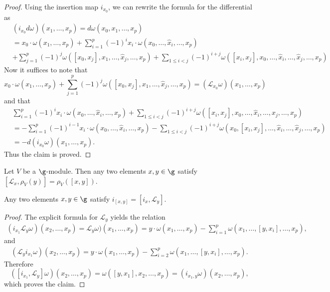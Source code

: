 \begin{proof}
Using the insertion map $i_{x_0}$, we can rewrite the formula for the differential as
\begin{equation*}\scriptstyle
\begin{aligned}
&(i_{x_0}d\omega)(x_1,\dots,x_p)=d\omega(x_0,x_1,\dots,x_p)\\
&=x_0\cdot\omega(x_1,\dots,x_p)+\sum_{i=1}^{p}(-1)^{i}x_i\cdot\omega(x_0,\dots,\widehat{x}_i,\dots,x_{p})\\
&+\sum_{j=1}^{p}(-1)^j\omega([x_0,x_j],x_1,\dots,\widehat{x}_j,\dots,x_p)+\sum_{1\leq i<j}(-1)^{i+j}\omega([x_i,x_j],x_0,\dots,\widehat{x}_i,\dots,\widehat{x}_j,\dots,x_{p})
\end{aligned}
\end{equation*}
Now it suffices to note that
\[x_0\cdot\omega(x_1,\dots,x_p)+\sum_{j=1}^{p}(-1)^j\omega([x_0,x_j],x_1,\dots,\widehat{x}_j,\dots,x_p)=(\mathcal{L}_{x_0}\omega)(x_1,\dots,x_p)\]
and that
\begin{equation*}\scriptstyle
\begin{aligned}
&\sum_{i=1}^{p}(-1)^{i}x_i\cdot\omega(x_0,\dots,\widehat{x}_i,\dots,x_{p})+\sum_{1\leq i<j}(-1)^{i+j}\omega([x_i,x_j],x_0,\dots,\widehat{x}_i,\dots,\widehat{x}_j,\dots,x_{p})\\
&=-\sum_{i=1}^{p}(-1)^{i-1}x_i\cdot\omega(x_0,\dots,\widehat{x}_i,\dots,x_p)-\sum_{1\leq i<j}(-1)^{i+j}\omega(x_0,[x_i,x_j],\dots,\widehat{x}_i,\dots,\widehat{x}_j,\dots,x_p)\\
&=-d(i_{x_0}\omega)(x_1,\dots,x_p).
\end{aligned}
\end{equation*}
Thus the claim is proved.
\end{proof}
\begin{proposition}\label{Lie algebra Lie derivative and action}
Let $V$ be a $\g$-module. Then any two elements $x,y\in\g$ satisfy $[\mathcal{L}_x,\rho_V(y)]=\rho_V([x,y])$.
\end{proposition}
\begin{proposition}\label{Lie algebra contraction braket}
Any two elements $x,y\in\g$ satisfy $i_{[x,y]}=[i_x,\mathcal{L}_y]$.
\end{proposition}
\begin{proof}
The explicit formula for $\mathcal{L}_y$ yields the relation
\begin{align*}
(i_{x_1}\mathcal{L}_y\omega)(x_2,\dots,x_p)=\mathcal{L}_y\omega)(x_1,\dots,x_p)=y\cdot\omega(x_1,\dots,x_p)-\sum_{i=1}^{p}\omega(x_1,\dots,[y,x_i],\dots,x_p),
\end{align*}
and
\begin{align*}
(\mathcal{L}_yi_{x_1}\omega)(x_2,\dots,x_p)=y\cdot\omega(x_1,\dots,x_p)-\sum_{i=2}^{p}\omega(x_1,\dots,[y,x_i],\dots,x_p).
\end{align*}
Therefore
\[([i_{x_1},\mathcal{L}_y]\omega)(x_2,\dots,x_p)=\omega([y,x_1],x_2,\dots,x_p)=(i_{x_1,y}\omega)(x_2,\dots,x_p),\]
which proves the claim.
\end{proof}
